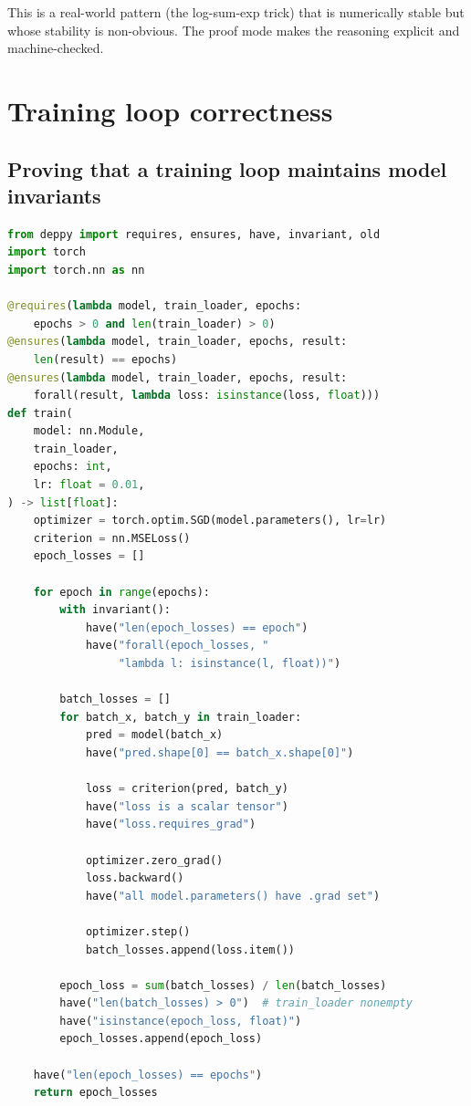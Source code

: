 \documentclass[11pt]{report}
\theoremstyle{definition}
\theoremstyle{plain}
\begin{document}
This is a real-world pattern (the log-sum-exp trick) that is numerically
stable but whose stability is non-obvious. The proof mode makes the reasoning
explicit and machine-checked.

\section{Training loop correctness}

\subsection{Proving that a training loop maintains model invariants}

\begin{lstlisting}[style=deppy,language=Python]
from deppy import requires, ensures, have, invariant, old
import torch
import torch.nn as nn

@requires(lambda model, train_loader, epochs:
    epochs > 0 and len(train_loader) > 0)
@ensures(lambda model, train_loader, epochs, result:
    len(result) == epochs)
@ensures(lambda model, train_loader, epochs, result:
    forall(result, lambda loss: isinstance(loss, float)))
def train(
    model: nn.Module,
    train_loader,
    epochs: int,
    lr: float = 0.01,
) -> list[float]:
    optimizer = torch.optim.SGD(model.parameters(), lr=lr)
    criterion = nn.MSELoss()
    epoch_losses = []

    for epoch in range(epochs):
        with invariant():
            have("len(epoch_losses) == epoch")
            have("forall(epoch_losses, "
                 "lambda l: isinstance(l, float))")

        batch_losses = []
        for batch_x, batch_y in train_loader:
            pred = model(batch_x)
            have("pred.shape[0] == batch_x.shape[0]")

            loss = criterion(pred, batch_y)
            have("loss is a scalar tensor")
            have("loss.requires_grad")

            optimizer.zero_grad()
            loss.backward()
            have("all model.parameters() have .grad set")

            optimizer.step()
            batch_losses.append(loss.item())

        epoch_loss = sum(batch_losses) / len(batch_losses)
        have("len(batch_losses) > 0")  # train_loader nonempty
        have("isinstance(epoch_loss, float)")
        epoch_losses.append(epoch_loss)

    have("len(epoch_losses) == epochs")
    return epoch_losses
\end{lstlisting}
\end{document}

